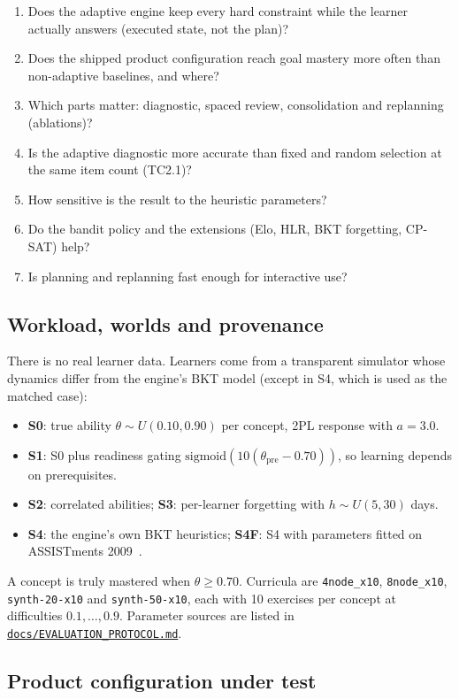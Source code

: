 \documentclass[11pt,a4paper]{article}
\newcommand{\finaltag}{cs5903-final-2026}
\newcommand{\repobase}{https://github.com/vhemanth06/AdaptEngine}
\newcommand{\repo}[1]{\href{\repobase/blob/\finaltag/#1}{\nolinkurl{#1}}}
\begin{document}
\begin{enumerate}[label=Q\arabic*.]
\item Does the adaptive engine keep every hard constraint while the learner actually answers (executed state, not the plan)?
\item Does the shipped product configuration reach goal mastery more often than non-adaptive baselines, and where?
\item Which parts matter: diagnostic, spaced review, consolidation and replanning (ablations)?
\item Is the adaptive diagnostic more accurate than fixed and random selection at the same item count (TC2.1)?
\item How sensitive is the result to the heuristic parameters?
\item Do the bandit policy and the extensions (Elo, HLR, BKT forgetting, CP-SAT) help?
\item Is planning and replanning fast enough for interactive use?
\end{enumerate}

\subsection{Workload, worlds and provenance}

There is no real learner data. Learners come from a transparent simulator whose dynamics differ from the engine's BKT model (except in S4, which is used as the matched case):
\begin{itemize}
\item \textbf{S0}: true ability $\theta\sim U(0.10,0.90)$ per concept, 2PL response with $a=3.0$.
\item \textbf{S1}: S0 plus readiness gating $\text{sigmoid}(10(\theta_{\text{pre}}-0.70))$, so learning depends on prerequisites.
\item \textbf{S2}: correlated abilities; \textbf{S3}: per-learner forgetting with $h\sim U(5,30)$ days.
\item \textbf{S4}: the engine's own BKT heuristics; \textbf{S4F}: S4 with parameters fitted on ASSISTments 2009~\cite{feng2009}.
\end{itemize}
A concept is truly mastered when $\theta\ge0.70$. Curricula are \texttt{4node\_x10}, \texttt{8node\_x10}, \texttt{synth-20-x10} and \texttt{synth-50-x10}, each with 10 exercises per concept at difficulties $0.1,\dots,0.9$. Parameter sources are listed in \repo{docs/EVALUATION_PROTOCOL.md}.

\subsection{Product configuration under test}
\end{document}
